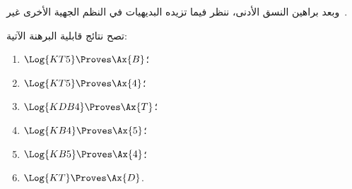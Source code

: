\documentclass[../../../include/open-logic-section]{subfiles}
\begin{document}


وبعد براهين النسق الأدنى، ننظر فيما تزيده البديهيات في النظم
الجهية الأخرى غير~.

\begin{prop}
تصح نتائج قابلية البرهنة الآتية:
  \begin{enumerate}
  \item $\Log{KT5} \Proves \Ax{B}$؛
  \item $\Log{KT5} \Proves \Ax{4}$؛
  \item $\Log{KDB4} \Proves \Ax{T}$؛
  \item $\Log{KB4} \Proves \Ax{5}$؛
  \item $\Log{KB5} \Proves \Ax{4}$؛
  \item {}$\Log{KT} \Proves \Ax{D}$.
  \end{enumerate}
\end{prop}
\end{document}
